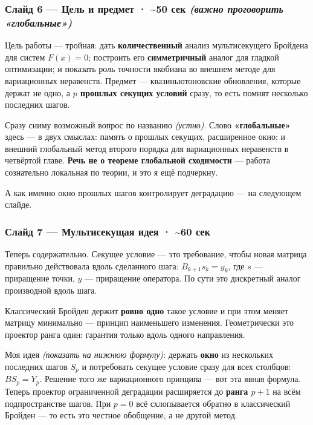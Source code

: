 \documentclass[12pt]{article}
\newenvironment{spoken}{%
  \par\addvspace{0.45em}\begingroup
  \color{spokencol}%
  \setlength{\leftskip}{1.5em}\setlength{\rightskip}{0.2em}%
  \setlength{\parindent}{0pt}%
  \everypar{\llap{{\color{barcol}\vrule width 2pt height 0.9em depth 0.35em}\hspace{0.9em}}}%
}{%
  \par\endgroup\addvspace{0.45em}}
\begin{document}
\subsubsection*{\color{headcol} Слайд 6 — Цель и предмет  ·  \textasciitilde{}50 сек  \textit{(важно проговорить «глобальные»)}}
\begin{spoken}
Цель работы — тройная: дать \textbf{количественный} анализ мультисекущего Бройдена для систем \(F(x)=0\); построить его \textbf{симметричный} аналог для гладкой оптимизации; и показать роль точности якобиана во внешнем методе для вариационных неравенств. Предмет — квазиньютоновские обновления, которые держат не одно, а \textbf{\(p\) прошлых секущих условий} сразу, то есть помнят несколько последних шагов.\par
Сразу сниму возможный вопрос по названию \textit{(устно)}. Слово \textbf{«глобальные»} здесь — в двух смыслах: память о прошлых секущих, расширенное окно; и внешний глобальный метод второго порядка для вариационных неравенств в четвёртой главе. \textbf{Речь не о теореме глобальной сходимости} — работа сознательно локальная по теории, и это я ещё подчеркну.\par
А как именно окно прошлых шагов контролирует деградацию — на следующем слайде.\par
\end{spoken}

\subsubsection*{\color{headcol} Слайд 7 — Мультисекущая идея  ·  \textasciitilde{}60 сек}
\begin{spoken}
Теперь содержательно. Секущее условие — это требование, чтобы новая матрица правильно действовала вдоль сделанного шага: \(B_{k+1} s_{k} = y_{k}\), где \(s\) — приращение точки, \(y\) — приращение оператора. По сути это дискретный аналог производной вдоль шага.\par
Классический Бройден держит \textbf{ровно одно} такое условие и при этом меняет матрицу минимально — принцип наименьшего изменения. Геометрически это проектор ранга один: гарантия только вдоль одного направления.\par
Моя идея \textit{(показать на нижнюю формулу)}: держать \textbf{окно} из нескольких последних шагов \(S_{p}\) и потребовать секущее условие сразу для всех столбцов: \(B S_{p} = Y_{p}\). Решение того же вариационного принципа — вот эта явная формула. Теперь проектор ограниченной деградации расширяется до \textbf{ранга \(p+1\)} на всём подпространстве шагов. При \(p=0\) всё схлопывается обратно в классический Бройден — то есть это честное обобщение, а не другой метод.\par
\end{spoken}
\end{document}
